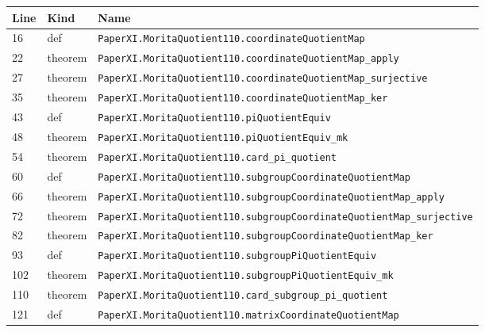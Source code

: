 \documentclass[10pt,oneside]{book}
\begin{document}
\begin{longtable}{@{}p{}p{}p{}@{}}\toprule Line&Kind&Name\\\midrule\endhead

16&def&\nolinkurl{PaperXI.MoritaQuotient110.coordinateQuotientMap}\\

22&theorem&\nolinkurl{PaperXI.MoritaQuotient110.coordinateQuotientMap_apply}\\

27&theorem&\nolinkurl{PaperXI.MoritaQuotient110.coordinateQuotientMap_surjective}\\

35&theorem&\nolinkurl{PaperXI.MoritaQuotient110.coordinateQuotientMap_ker}\\

43&def&\nolinkurl{PaperXI.MoritaQuotient110.piQuotientEquiv}\\

48&theorem&\nolinkurl{PaperXI.MoritaQuotient110.piQuotientEquiv_mk}\\

54&theorem&\nolinkurl{PaperXI.MoritaQuotient110.card_pi_quotient}\\

60&def&\nolinkurl{PaperXI.MoritaQuotient110.subgroupCoordinateQuotientMap}\\

66&theorem&\nolinkurl{PaperXI.MoritaQuotient110.subgroupCoordinateQuotientMap_apply}\\

72&theorem&\nolinkurl{PaperXI.MoritaQuotient110.subgroupCoordinateQuotientMap_surjective}\\

82&theorem&\nolinkurl{PaperXI.MoritaQuotient110.subgroupCoordinateQuotientMap_ker}\\

93&def&\nolinkurl{PaperXI.MoritaQuotient110.subgroupPiQuotientEquiv}\\

102&theorem&\nolinkurl{PaperXI.MoritaQuotient110.subgroupPiQuotientEquiv_mk}\\

110&theorem&\nolinkurl{PaperXI.MoritaQuotient110.card_subgroup_pi_quotient}\\

121&def&\nolinkurl{PaperXI.MoritaQuotient110.matrixCoordinateQuotientMap}\\


\end{longtable}
\end{document}

